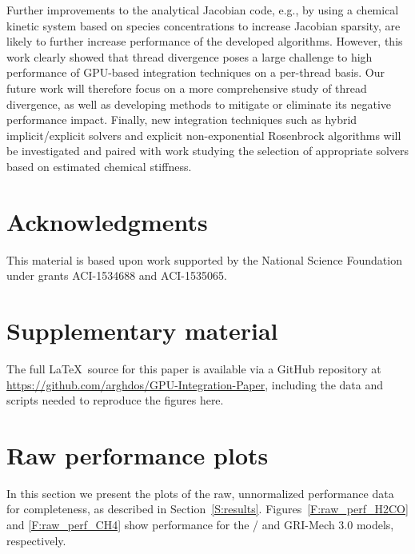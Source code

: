 \documentclass[preprint]{elsarticle}
\begin{document}
Further improvements to the analytical Jacobian code, e.g., by using a chemical kinetic system based on species concentrations to increase Jacobian sparsity, are likely to further increase performance of the developed algorithms.
However, this work clearly showed that thread divergence poses a large challenge to high performance of GPU-based integration techniques on a per-thread basis.
Our future work will therefore focus on a more comprehensive study of thread divergence, as well as developing methods to mitigate or eliminate its negative performance impact.
Finally, new integration techniques such as hybrid implicit\slash explicit solvers and explicit non-exponential Rosenbrock algorithms will be investigated and paired with work studying the selection of appropriate solvers based on estimated chemical stiffness.


\section*{Acknowledgments}

This material is based upon work supported by the National Science Foundation under grants ACI-1534688 and ACI-1535065.

\appendix
\setcounter{figure}{0}

\renewcommand*{\thesection}{\appendixname~\Alph{section}}

\section{Supplementary material}

The full \LaTeX\ source for this paper is available via a GitHub repository at \url{https://github.com/arghdos/GPU-Integration-Paper}, including the data and scripts needed to reproduce the figures here.

\section{Raw performance plots}
\label{S:raw}

In this section we present the plots of the raw, unnormalized performance data for completeness, as described in Section~\ref{S:results}.
Figures~\ref{F:raw_perf_H2CO} and \ref{F:raw_perf_CH4} show performance for the \slash{} and GRI-Mech 3.0 models, respectively.
\end{document}

